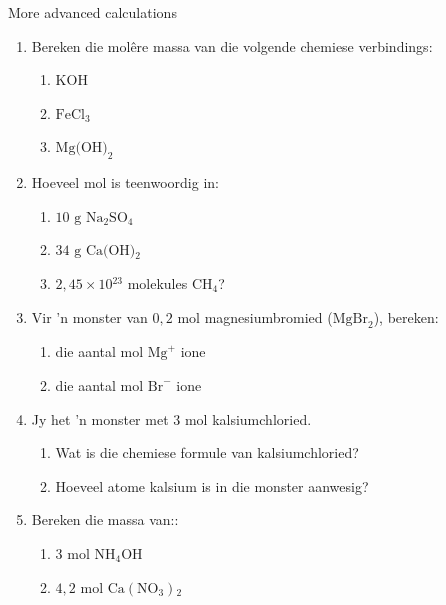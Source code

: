             \begin{exercises}{  More advanced calculations }
            \nopagebreak \noindent
      \label{m38717*id279756}\begin{enumerate}[noitemsep, label=\textbf{\arabic*}. ] 
            \label{m38717*uid47}\item Bereken die mol\^{e}re massa van die volgende chemiese verbindings:
\label{m38717*id279772}\begin{enumerate}[noitemsep, label=\textbf{\alph*}. ] 
            \label{m38717*uid48}\item $\text{KOH}$
\label{m38717*uid49}\item $\text{FeCl}{}_{3}$
\label{m38717*uid50}\item ${\text{Mg(OH)}}_{2}$
\end{enumerate}
                \label{m38717*uid51}\item Hoeveel mol is teenwoordig in:
\label{m38717*id279848}\begin{enumerate}[noitemsep, label=\textbf{\alph*}. ] 
            \label{m38717*uid52}\item $10 \text{ g}$ $\text{Na}_{2}\text{SO}{}_{4}$
\label{m38717*uid53}\item $34 \text{ g}$ $\text{Ca(OH)}{}_{2}$
\label{m38717*uid54}\item $2,45 \times 10{}^{23}$ molekules $\text{CH}{}_{4}$?
\end{enumerate}
                \label{m38717*uid55}\item Vir  'n monster van $0,2 \text{ mol}$ magnesiumbromied ($\text{MgBr}_{2}$), bereken:
\label{m38717*id279964}\begin{enumerate}[noitemsep, label=\textbf{\alph*}. ] 
            \label{m38717*uid56}\item die aantal mol ${\text{Mg}}^{+}$ ione
\label{m38717*uid57}\item die aantal mol ${\text{Br}}^{-}$ ione
\end{enumerate}
                \label{m38717*uid58}\item Jy het  'n monster met $3 \text{ mol}$ kalsiumchloried.
\label{m38717*id280031}\begin{enumerate}[noitemsep, label=\textbf{\alph*}. ] 
            \label{m38717*uid59}\item Wat is die chemiese formule van kalsiumchloried?
\label{m38717*uid60}\item Hoeveel atome kalsium is in die monster aanwesig?
\end{enumerate}
               \label{m38717*uid61}\item Bereken die massa van::
\label{m38717*id280072}\begin{enumerate}[noitemsep, label=\textbf{\alph*}. ] 
            \label{m38717*uid62}\item $3\text{ mol}$ $\text{NH}{}_{4}\text{OH}$
\label{m38717*uid63}\item $4,2 \text{ mol}$ $\text{Ca}\left(\text{NO}{}_{3}\right){}_{2}$\end{enumerate}


\end{enumerate}
\end{exercises}
